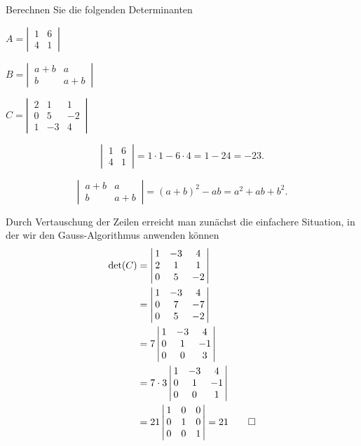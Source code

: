 %
%
Berechnen Sie die folgenden Determinanten
\begin{teilaufgaben}
\item $A=\left|\,\begin{matrix}1&6\\4&1\end{matrix}\,\right|$
\item $B=\left|\,\begin{matrix}a+b&a\\b&a+b\end{matrix}\,\right|$
\item $C=\left|\,\begin{matrix}2&1&1\\0&5&-2\\1&-3&4\end{matrix}\,\right|$
\end{teilaufgaben}


\begin{loesung}
\begin{teilaufgaben}
\item
\[
\left|\,\begin{matrix}1&6\\4&1\end{matrix}\,\right|=1\cdot 1-6\cdot 4=1-24=-23.
\]
\item
\[
\left|\,\begin{matrix}a+b&a\\b&a+b\end{matrix}\,\right|=(a+b)^2 -ab=a^2+ab+b^2.
\]
\item Durch Vertauschung der Zeilen erreicht man zunächst die einfachere
Situation, in der wir den Gauss-Algorithmus anwenden können
\begin{align*}
\det(C)&=
\left|\,\begin{matrix}
1&-3&4\\
2&1&1\\
0&5&-2
\end{matrix}\,\right|
\\
&=
\left|\,\begin{matrix}
1&-3&4\\
0&7&-7\\
0&5&-2
\end{matrix}\,\right|
\\
&=
7\left|\,\begin{matrix}
1&-3&4\\
0&1&-1\\
0&0&3
\end{matrix}\,\right|
\\
&=
7\cdot 3
\left|\,\begin{matrix}
1&-3&4\\
0&1&-1\\
0&0&1
\end{matrix}\,\right|
\\
&=21
\left|\,\begin{matrix}
1&0&0\\
0&1&0\\
0&0&1
\end{matrix}\,\right|=21
\qedhere
\end{align*}
\end{teilaufgaben}
\end{loesung}
